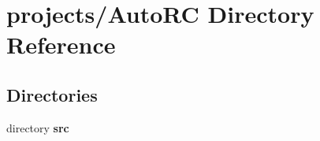\section{projects/\+Auto\+RC Directory Reference}
\label{dir_60766537d117eabbe0fd1d3a1273075b}
\subsection*{Directories}
\begin{DoxyCompactItemize}
\item 
directory \textbf{ src}
\end{DoxyCompactItemize}
